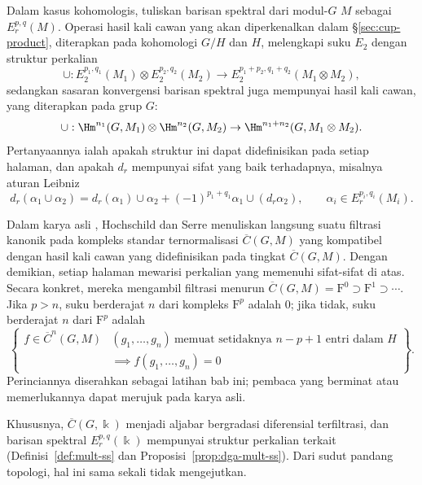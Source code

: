 \begin{remark}\label{rem:LHS-SS-mult}
	Dalam kasus kohomologis, tuliskan barisan spektral dari modul-$G$ $M$
	sebagai $E_r^{p,q}(M)$. Operasi hasil kali cawan yang akan diperkenalkan
	dalam \S\ref{sec:cup-product}, diterapkan pada kohomologi $G/H$ dan $H$,
	melengkapi suku $E_2$ dengan struktur perkalian
	\[ \cup:E_2^{p_1,q_1}(M_1)\otimes E_2^{p_2,q_2}(M_2)
	\to E_2^{p_1+p_2,q_1+q_2}(M_1\otimes M_2), \]
	sedangkan sasaran konvergensi barisan spektral juga mempunyai hasil kali
	cawan, yang diterapkan pada grup $G$:
	\[ \cup:\Hm^{n_1}(G,M_1)\otimes\Hm^{n_2}(G,M_2)
	\to\Hm^{n_1+n_2}(G,M_1\otimes M_2). \]
	Pertanyaannya ialah apakah struktur ini dapat didefinisikan pada
	setiap halaman, dan apakah $d_r$ mempunyai sifat yang baik terhadapnya,
	misalnya aturan Leibniz
	\[ d_r(\alpha_1\cup\alpha_2)
	=d_r(\alpha_1)\cup\alpha_2
	+(-1)^{p_1+q_1}\alpha_1\cup(d_r\alpha_2),
	\qquad \alpha_i\in E_r^{p_i,q_i}(M_i). \]

	Dalam karya asli \cite[hlm.~118--119]{HS53}, Hochschild dan Serre menuliskan
	langsung suatu filtrasi kanonik pada kompleks standar ternormalisasi
	$\overline{C}(G,M)$ yang kompatibel dengan hasil kali cawan yang
	didefinisikan pada tingkat $\overline{C}(G,M)$. Dengan demikian, setiap
	halaman mewarisi perkalian yang memenuhi sifat-sifat di atas. Secara
	konkret, mereka mengambil filtrasi menurun
	$\overline{C}(G,M)=\mathrm{F}^0\supset\mathrm{F}^1\supset\cdots$. Jika
	$p>n$, suku berderajat $n$ dari kompleks $\mathrm{F}^p$ adalah $0$;
	jika tidak, suku berderajat $n$ dari $\mathrm{F}^p$ adalah
	\[ \left\{\begin{array}{r|l}
		f\in\overline{C}^n(G,M) &
		(g_1,\ldots,g_n)\ \text{memuat setidaknya }n-p+1\text{ entri dalam }H\\
		&\implies f(g_1,\ldots,g_n)=0
	\end{array}\right\}. \]
	Perinciannya diserahkan sebagai latihan bab ini; pembaca yang berminat atau
	memerlukannya dapat merujuk pada karya asli.

	Khususnya, $\overline{C}(G,\Bbbk)$ menjadi aljabar bergradasi diferensial
	terfiltrasi, dan barisan spektral $E_r^{p,q}(\Bbbk)$ mempunyai struktur
	perkalian terkait (Definisi~\ref{def:mult-ss} dan
	Proposisi~\ref{prop:dga-mult-ss}). Dari sudut pandang topologi, hal ini sama
	sekali tidak mengejutkan.
\end{remark}
